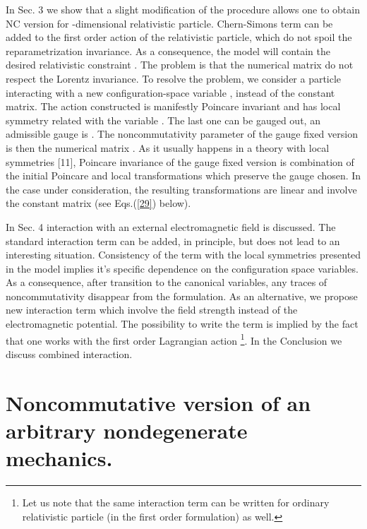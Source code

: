 \documentclass[paper a4]{article}
\begin{document}
In Sec. 3 we show that a slight modification of the procedure allows one
to obtain NC version for \coordHE{}-dimensional relativistic
particle. Chern-Simons term can
be added to the first order action of the relativistic particle, which do
not spoil the reparametrization invariance. As a consequence,
the model will contain the desired relativistic constraint \coordHE{}.
The problem is
that the numerical matrix \myHighlight{$\theta^{\mu\nu}$}\coordHE{} do not respect the Lorentz
invariance. To resolve the problem, we consider a particle interacting
with a new configuration-space variable
\myHighlight{$\theta^{\mu\nu}(\tau)=-\theta^{\nu\mu}(\tau)$}\coordHE{},
instead of the constant matrix. The action constructed is manifestly
Poincare invariant and has local symmetry related with the variable
\myHighlight{$\theta$}\coordHE{}. The last one can be gauged out, an admissible gauge is
\coordHE{}. The noncommutativity parameter of the
gauge fixed version is then the numerical matrix \coordHE{}. As it 
usually happens in a
theory with local symmetries [11], Poincare invariance of the gauge
fixed version is combination of the initial Poincare and local
transformations which preserve the gauge chosen. In the case under
consideration, the resulting transformations are linear and
involve the constant matrix \coordHE{} (see Eqs.(\ref{29}) below).

In Sec. 4 interaction with an external electromagnetic field is discussed.
The standard interaction term can be added, in principle, but does not
lead to an interesting situation. Consistency of the term with the
local symmetries presented in the model implies it's specific dependence
on the configuration space variables. As a consequence, after transition
to the canonical variables,
any traces of noncommutativity disappear from the formulation.
As an alternative, we propose new interaction term which involve the
field strength instead of the electromagnetic potential. The possibility to
write the term is implied by the fact that one works with the first
order Lagrangian action \footnote{Let us note that the same
interaction term can be written for ordinary relativistic particle
(in the first order formulation) as well.}.
In the Conclusion we discuss combined interaction.

\section{Noncommutative version of an arbitrary nondegenerate mechanics.}
\end{document}
